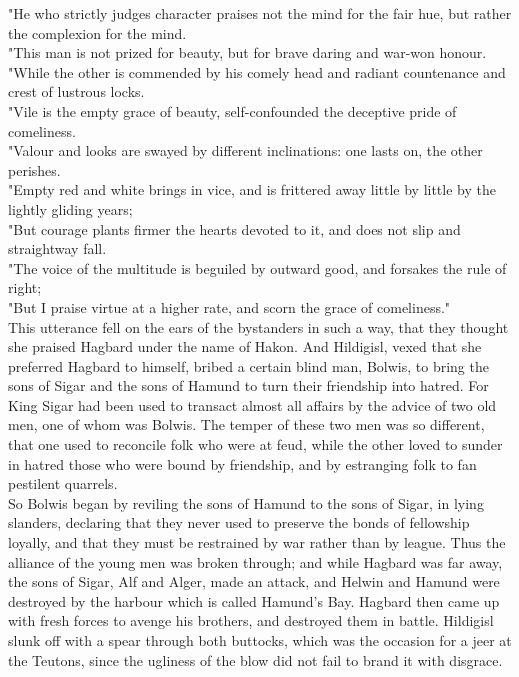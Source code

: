 \documentclass[10pt,a4paper]{report}
\begin{document}
"He who strictly judges character praises not the mind for the fair hue, but rather the complexion for the mind.\\

"This man is not prized for beauty, but for brave daring and war-won honour.\\

"While the other is commended by his comely head and radiant countenance and crest of lustrous locks.\\

"Vile is the empty grace of beauty, self-confounded the deceptive pride of comeliness.\\

"Valour and looks are swayed by different inclinations: one lasts on, the other perishes.\\

"Empty red and white brings in vice, and is frittered away little by little by the lightly gliding years;\\

"But courage plants firmer the hearts devoted to it, and does not slip and straightway fall.\\

"The voice of the multitude is beguiled by outward good, and forsakes the rule of right;\\

"But I praise virtue at a higher rate, and scorn the grace of comeliness."\\

This utterance fell on the ears of the bystanders in such a way, that they thought she praised Hagbard under the name of Hakon. And Hildigisl, vexed that she preferred Hagbard to himself, bribed a certain blind man, Bolwis, to bring the sons of Sigar and the sons of Hamund to turn their friendship into hatred. For King Sigar had been used to transact almost all affairs by the advice of two old men, one of whom was Bolwis. The temper of these two men was so different, that one used to reconcile folk who were at feud, while the other loved to sunder in hatred those who were bound by friendship, and by estranging folk to fan pestilent quarrels.\\

So Bolwis began by reviling the sons of Hamund to the sons of Sigar, in lying slanders, declaring that they never used to preserve the bonds of fellowship loyally, and that they must be restrained by war rather than by league. Thus the alliance of the young men was broken through; and while Hagbard was far away, the sons of Sigar, Alf and Alger, made an attack, and Helwin and Hamund were destroyed by the harbour which is called Hamund's Bay. Hagbard then came up with fresh forces to avenge his brothers, and destroyed them in battle. Hildigisl slunk off with a spear through both buttocks, which was the occasion for a jeer at the Teutons, since the ugliness of the blow did not fail to brand it with disgrace.\\
\end{document}
